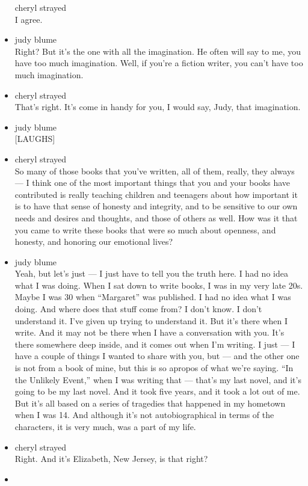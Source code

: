 \begin{itemize}
  cheryl strayed\\
  I agree.
\item
  judy blume\\
  Right? But it's the one with all the imagination. He often will say to
  me, you have too much imagination. Well, if you're a fiction writer,
  you can't have too much imagination.
\item
  cheryl strayed\\
  That's right. It's come in handy for you, I would say, Judy, that
  imagination.
\item
  judy blume\\
  {[}LAUGHS{]}
\item
  cheryl strayed\\
  So many of those books that you've written, all of them, really, they
  always --- I think one of the most important things that you and your
  books have contributed is really teaching children and teenagers about
  how important it is to have that sense of honesty and integrity, and
  to be sensitive to our own needs and desires and thoughts, and those
  of others as well. How was it that you came to write these books that
  were so much about openness, and honesty, and honoring our emotional
  lives?
\item
  judy blume\\
  Yeah, but let's just --- I just have to tell you the truth here. I had
  no idea what I was doing. When I sat down to write books, I was in my
  very late 20s. Maybe I was 30 when ``Margaret'' was published. I had
  no idea what I was doing. And where does that stuff come from? I don't
  know. I don't understand it. I've given up trying to understand it.
  But it's there when I write. And it may not be there when I have a
  conversation with you. It's there somewhere deep inside, and it comes
  out when I'm writing. I just --- I have a couple of things I wanted to
  share with you, but --- and the other one is not from a book of mine,
  but this is so apropos of what we're saying. ``In the Unlikely
  Event,'' when I was writing that --- that's my last novel, and it's
  going to be my last novel. And it took five years, and it took a lot
  out of me. But it's all based on a series of tragedies that happened
  in my hometown when I was 14. And although it's not autobiographical
  in terms of the characters, it is very much, was a part of my life.
\item
  cheryl strayed\\
  Right. And it's Elizabeth, New Jersey, is that right?
\item

\end{itemize}
